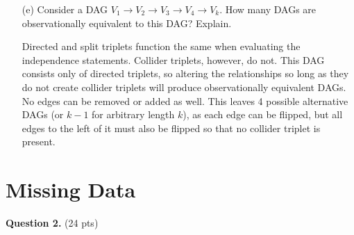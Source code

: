 \documentclass[11pt]{article}
\begin{document}
\begin{enumerate}
\begin{answertext}{3cm}{}

$\{A \to B\}$\\
$\{A \to B \to C\}$\\
$\{A \to B \to C, A \to C\}$\\
$\{A \to B, A \to C\}$
    
\end{answertext}

\item[(e)] Consider a DAG $V_1 \to V_2 \to V_3 \to V_4 \to V_k$.  How many DAGs are observationally equivalent to this DAG?  Explain.

\begin{answertext}{3.5cm}{}

Directed and split triplets function the same when evaluating the independence statements. Collider triplets, however, do not. This DAG consists only of directed triplets, so altering the relationships so long as they do not create collider triplets will produce observationally equivalent DAGs. No edges can be removed or added as well. This leaves 4 possible alternative DAGs (or $k-1$ for arbitrary length $k$), as each edge can be flipped, but all edges to the left of it must also be flipped so that no collider triplet is present.
    
\end{answertext}

\end{enumerate}

\newpage %

\section*{Missing Data}

{\bf Question 2.} (24 pts)
\end{document}
